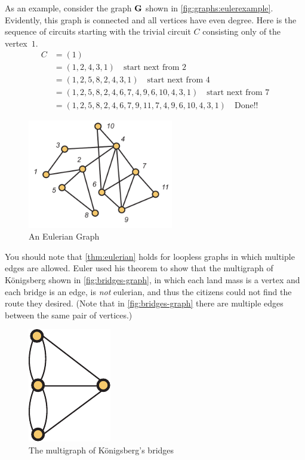 As an example, consider the graph $\mathbf{G}$ shown in \autoref{fig:graphs:eulerexample}.
Evidently, this graph is connected and all vertices have even degree.
Here is the sequence of circuits starting with the trivial circuit $C$
consisting only of the vertex~$1$.
\begin{align*}
C &=(1)\\
  &=(1,2,4,3,1)\quad \text{start next from $2$}\\ 
  &=(1,2,5,8,2,4,3,1)\quad\text{start next from $4$}\\
  &=(1,2,5,8,2,4,6,7,4,9,6,10,4,3,1)\quad\text{start next from $7$}\\
  &=(1,2,5,8,2,4,6,7,9,11,7,4,9,6,10,4,3,1)\quad\text{Done!!}
\end{align*}	
  
\begin{figure}
  \centering
  \includegraphics[width=2.5in]{graphs-figs/eulerian_graph}

  \caption{An Eulerian Graph}
  \label{fig:graphs:eulerexample}
\end{figure}
You should note that \autoref{thm:eulerian} holds for loopless graphs
in which multiple edges are allowed.  Euler used his theorem to show
that the multigraph of K\"onigsberg shown in
\autoref{fig:bridges-graph}, in which each land mass is a vertex and
each bridge is an edge, is \textit{not} eulerian, and thus the
citizens could not find the route they desired. (Note that in
\autoref{fig:bridges-graph} there are multiple edges between the same
pair of vertices.)

\begin{figure}[h]
  \centering
  \includegraphics{graphs-figs/konigsberg_graph}
  \caption{The multigraph of K\"onigsberg's bridges}
  \label{fig:bridges-graph}
\end{figure}

